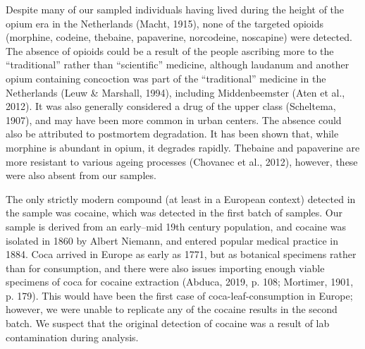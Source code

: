 \documentclass[
]{article}
\begin{document}
Despite many of our sampled individuals having lived during the height
of the opium era in the Netherlands (Macht, 1915), none of the targeted
opioids (morphine, codeine, thebaine, papaverine, norcodeine, noscapine)
were detected. The absence of opioids could be a result of the people
ascribing more to the ``traditional'' rather than ``scientific''
medicine, although laudanum and another opium containing concoction was
part of the ``traditional'' medicine in the Netherlands (Leuw \&
Marshall, 1994), including Middenbeemster (Aten et al., 2012). It was
also generally considered a drug of the upper class (Scheltema, 1907),
and may have been more common in urban centers. The absence could also
be attributed to postmortem degradation. It has been shown that, while
morphine is abundant in opium, it degrades rapidly. Thebaine and
papaverine are more resistant to various ageing processes (Chovanec et
al., 2012), however, these were also absent from our samples.

The only strictly modern compound (at least in a European context)
detected in the sample was cocaine, which was detected in the first
batch of samples. Our sample is derived from an early--mid 19th century
population, and cocaine was isolated in 1860 by Albert Niemann, and
entered popular medical practice in 1884. Coca arrived in Europe as
early as 1771, but as botanical specimens rather than for consumption,
and there were also issues importing enough viable specimens of coca for
cocaine extraction (Abduca, 2019, p. 108; Mortimer, 1901, p. 179). This
would have been the first case of coca-leaf-consumption in Europe;
however, we were unable to replicate any of the cocaine results in the
second batch. We suspect that the original detection of cocaine was a
result of lab contamination during analysis.
\end{document}
